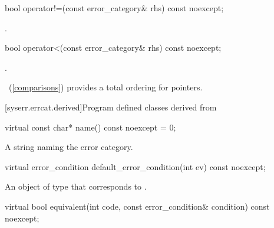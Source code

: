 %
%
\begin{itemdecl}
bool operator!=(const error_category& rhs) const noexcept;
\end{itemdecl}

\begin{itemdescr}
\pnum
\returns {}.
\end{itemdescr}

%
\begin{itemdecl}
bool operator<(const error_category& rhs) const noexcept;
\end{itemdecl}

\begin{itemdescr}
\pnum
\returns {}.

\begin{note} ~(\ref{comparisons}) provides a total ordering for pointers. \end{note}
\end{itemdescr}

[syserr.errcat.derived]{Program defined classes derived from }

%
\begin{itemdecl}
virtual const char* name() const noexcept = 0;
\end{itemdecl}

\begin{itemdescr}
\pnum
\returns A string naming the error category.
\end{itemdescr}

%
\begin{itemdecl}
virtual error_condition default_error_condition(int ev) const noexcept;
\end{itemdecl}

\begin{itemdescr}
\pnum
\returns An object of type  that corresponds to .
\end{itemdescr}

%
\begin{itemdecl}
virtual bool equivalent(int code, const error_condition& condition) const noexcept;
\end{itemdecl}

